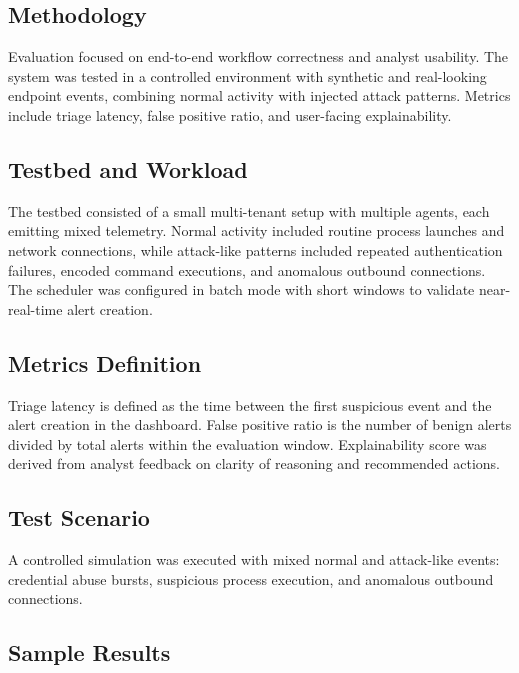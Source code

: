 \documentclass[conference]{IEEEtran}
\begin{document}
\subsection{Methodology}
Evaluation focused on end-to-end workflow correctness and analyst usability. The system was tested in a controlled environment with synthetic and real-looking endpoint events, combining normal activity with injected attack patterns. Metrics include triage latency, false positive ratio, and user-facing explainability.
\subsection{Testbed and Workload}
The testbed consisted of a small multi-tenant setup with multiple agents, each emitting mixed telemetry. Normal activity included routine process launches and network connections, while attack-like patterns included repeated authentication failures, encoded command executions, and anomalous outbound connections. The scheduler was configured in batch mode with short windows to validate near-real-time alert creation.
\subsection{Metrics Definition}
Triage latency is defined as the time between the first suspicious event and the alert creation in the dashboard. False positive ratio is the number of benign alerts divided by total alerts within the evaluation window. Explainability score was derived from analyst feedback on clarity of reasoning and recommended actions.
\subsection{Test Scenario}
A controlled simulation was executed with mixed normal and attack-like events:
credential abuse bursts, suspicious process execution, and anomalous outbound connections.

\subsection{Sample Results}
\begin{table}[!t]
\centering
{}
\caption{Illustrative operational comparison.}
\label{tab:results}
\end{table}
\end{document}
